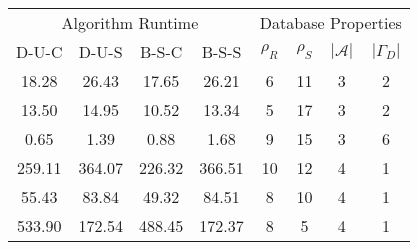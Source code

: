 \begin{tabular}{cccccccc}
\toprule
\multicolumn{4}{c}{Algorithm Runtime} & \multicolumn{4}{c}{Database
Properties} \\
D-U-C & D-U-S & B-S-C & B-S-S & $\rho_R$ & $\rho_S$ & $|\mathcal{A}|$ & $|\Gamma_D|$ \\
\midrule
18.28 & 26.43 & 17.65 & 26.21 & 6 & 11 & 3 & 2 \\
13.50 & 14.95 & 10.52 & 13.34 & 5 & 17 & 3 & 2 \\
0.65 & 1.39 & 0.88 & 1.68 & 9 & 15 & 3 & 6 \\
259.11 & 364.07 & 226.32 & 366.51 & 10 & 12 & 4 & 1 \\
55.43 & 83.84 & 49.32 & 84.51 & 8 & 10 & 4 & 1 \\
533.90 & 172.54 & 488.45 & 172.37 & 8 & 5 & 4 & 1 \\
\bottomrule
\end{tabular}
